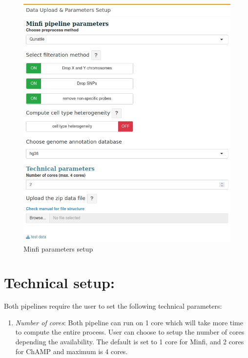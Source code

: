 \documentclass[
  a4paper,
  oneside,
  open=any]{scrreport}
\providecommand{\tightlist}{%
  \setlength{\itemsep}{0pt}\setlength{\parskip}{0pt}}\usepackage{longtable,booktabs,array}
\begin{document}
\begin{figure}[H]

{\centering \includegraphics{./_images/methylysis_03.png}

}

\caption{Minfi parameters setup}

\end{figure}

\hypertarget{technical-setup}{%
\section{Technical setup:}\label{technical-setup}}

Both pipelines require the user to set the following technical
parameters:

\begin{enumerate}
\def\labelenumi{\arabic{enumi}.}
\tightlist
\item
  \emph{Number of cores}: Both pipeline can run on 1 core which will
  take more time to compute the entire process. User can choose to setup
  the number of cores depending the availability. The default is set to
  1 core for Minfi, and 2 cores for ChAMP and maximum is 4 cores.
\end{enumerate}
\end{document}
